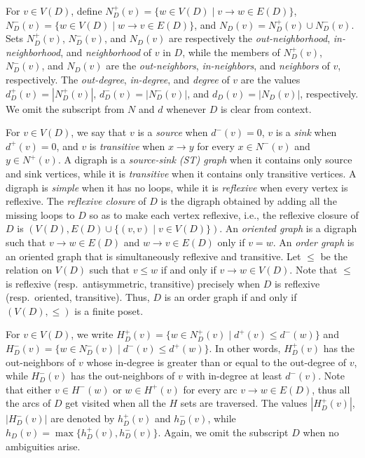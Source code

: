 \documentclass[a4paper,11pt]{article}
\begin{document}
For $v \in V(D)$, define $N_D^+(v) = \{w \in V(D) \mid v \to w \in E(D)\}$, $N_D^-(v) = \{w \in V(D) \mid w \to v \in E(D)\}$, and $N_D(v) = N_D^+(v) \cup N_D^-(v)$.  Sets $N_D^+(v)$, $N_D^-(v)$, and $N_D(v)$ are respectively the \emph{out-neighborhood}, \emph{in-neighborhood}, and \emph{neighborhood} of $v$ in $D$, while the members of $N_D^+(v)$, $N_D^-(v)$, and $N_D(v)$ are the \emph{out-neighbors}, \emph{in-neighbors}, and \emph{neighbors} of $v$, respectively.  The \emph{out-degree}, \emph{in-degree}, and \emph{degree} of $v$ are the values $d_D^+(v) = |N_D^+(v)|$, $d_D^-(v) = |N_D^-(v)|$, and $d_D(v) = |N_D(v)|$, respectively.  We omit the subscript from $N$ and $d$ whenever $D$ is clear from context.

For $v \in V(D)$, we say that $v$ is a \emph{source} when $d^-(v) = 0$,  $v$ is a \emph{sink} when $d^+(v) = 0$, and $v$ is \emph{transitive} when $x \to y$ for every $x \in N^-(v)$ and $y \in N^+(v)$.  A digraph is a \emph{source-sink (ST) graph} when it contains only source and sink vertices, while it is \emph{transitive} when it contains only transitive vertices.  A digraph is \emph{simple} when it has no loops, while it is \emph{reflexive} when every vertex is reflexive.  The \emph{reflexive closure} of $D$ is the digraph obtained by adding all the missing loops to $D$ so as to make each vertex reflexive, i.e., the reflexive closure of $D$ is $(V(D), E(D) \cup \{(v,v) \mid v \in V(D)\})$.  An \emph{oriented graph} is a digraph such that $v \to w \in E(D)$ and $w \to v \in E(D)$ only if $v = w$.  An \emph{order graph} is an oriented graph that is simultaneously reflexive and transitive.  Let $\leq$ be the relation on $V(D)$ such that $v\leq w$ if and only if $v \to w \in V(D)$.  Note that $\leq$ is reflexive (resp.\ antisymmetric, transitive) precisely when $D$ is reflexive (resp.\ oriented, transitive).  Thus, $D$ is an order graph if and only if $(V(D), \leq)$ is a finite poset.

For $v \in V(D)$, we write $H_D^+(v) = \{w \in N_D^+(v) \mid d^+(v) \leq d^-(w)\}$ and $H_D^-(v) = \{w \in N_D^-(v) \mid d^-(v) \leq d^+(w)\}$.  In other words, $H_D^+(v)$ has the out-neighbors of $v$ whose in-degree is greater than or equal to the out-degree of $v$, while $H_D^-(v)$ has the out-neighbors of $v$ with in-degree at least $d^-(v)$.  Note that either $v \in H^-(w)$ or $w \in H^+(v)$ for every arc $v \to w \in E(D)$, thus all the arcs of $D$ get visited when all the $H$ sets are traversed.  The values $|H^+_D(v)|$, $|H^-_D(v)|$ are denoted by $h^+_D(v)$ and $h^-_D(v)$, while $h_D(v) = \max\{h_D^+(v), h_D^-(v)\}$.  Again, we omit the subscript $D$ when no ambiguities arise.
\end{document}
